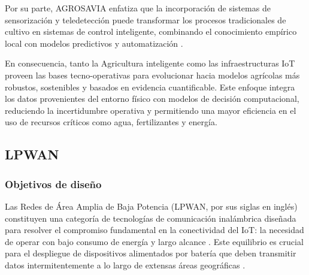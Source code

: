 Por  su  parte,  AGROSAVIA  enfatiza  que  la  incorporación  de   sistemas   de
sensorización y teledetección puede transformar los  procesos  tradicionales  de
cultivo en sistemas de control inteligente, combinando el conocimiento  empírico
local       con        modelos        predictivos        y        automatización
\parencite[]{florez2021agroindustria}.

En consecuencia, tanto la Agricultura inteligente como las infraestructuras  IoT
proveen las bases tecno-operativas para evolucionar hacia modelos agrícolas  más
robustos, sostenibles y basados en evidencia cuantificable. Este enfoque integra
los datos provenientes del entorno físico con modelos de decisión computacional,
reduciendo la incertidumbre operativa y permitiendo una mayor eficiencia  en  el
uso de recursos críticos como agua, fertilizantes y energía.


\subsection{LPWAN}

\subsubsection{Objetivos de diseño} Las Redes de Área Amplia  de  Baja  Potencia
(LPWAN, por sus siglas en inglés) constituyen una categoría  de  tecnologías  de
comunicación inalámbrica diseñada para resolver el compromiso fundamental en  la
conectividad del IoT: la necesidad de operar con bajo consumo de energía y largo
alcance \parencite[]{diane2025systematic}. Este equilibrio es  crucial  para  el
despliegue de dispositivos alimentados por batería que  deben  transmitir  datos
intermitentemente    a    lo    largo    de    extensas    áreas     geográficas
\parencite[]{chen2018cognitive}.

